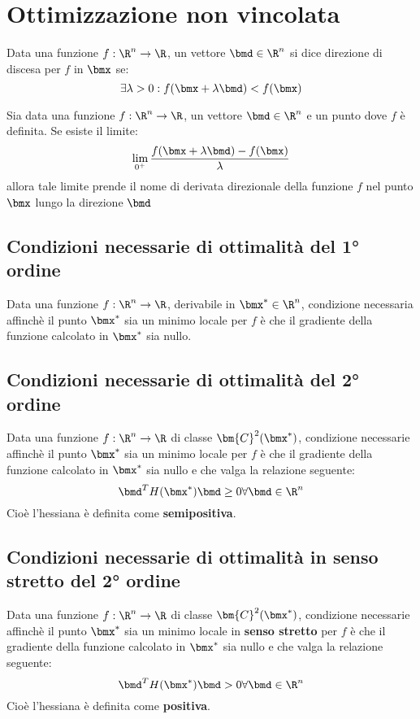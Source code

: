 \documentclass[\main/main.tex]{subfiles}
\begin{document}
\chapter{Ottimizzazione non vincolata}
\begin{definition}
	Data una funzione \(f:\R^n \rightarrow \R \), un vettore \(\bmd \in \R^n\) si dice direzione di discesa per \(f\) in \(\bmx \) se:
	\[
		\exists \lambda > 0: f(\bmx + \lambda\bmd) < f(\bmx)
	\]
\end{definition}
\begin{definition}
	Sia data una funzione \(f: \R^n \rightarrow \R \), un vettore \(\bmd \in \R^n\) e un punto dove \(f\) è definita. Se esiste il limite:
	\[
		\lim_{0^+} \frac{f(\bmx + \lambda\bmd) - f(\bmx)}{\lambda}
	\]
	allora tale limite prende il nome di derivata direzionale della funzione \(f\) nel punto \(\bmx \) lungo la direzione \(\bmd \)
\end{definition}

\section{Condizioni necessarie di ottimalità del 1° ordine}
\begin{theorem}
	Data una funzione \(f: \R^n \rightarrow \R \), derivabile in \(\bmx^* \in \R^n\), condizione necessaria affinchè il punto \(\bmx^* \) sia un minimo locale per \(f\) è che il gradiente della funzione calcolato in \(\bmx^*\) sia nullo.
\end{theorem}
\section{Condizioni necessarie di ottimalità del 2° ordine}
\begin{theorem}
	Data una funzione \(f: \R^n \rightarrow \R \) di classe \(\bm{C}^2(\bmx^*)\), condizione necessarie affinchè il punto \(\bmx^* \) sia un minimo locale per \(f\) è che il gradiente della funzione calcolato in \(\bmx^*\) sia nullo e che valga la relazione seguente:
	\[
		\bmd^T H (\bmx^*)\bmd \geq 0 \forall \bmd \in \R^n
	\]
	Cioè l'hessiana è definita come \textbf{semipositiva}.
\end{theorem}
\section{Condizioni necessarie di ottimalità in senso stretto del 2° ordine}
\begin{theorem}
	Data una funzione \(f: \R^n \rightarrow \R \) di classe \(\bm{C}^2(\bmx^*)\), condizione necessarie affinchè il punto \(\bmx^* \) sia un minimo locale in \textbf{senso stretto} per \(f\) è che il gradiente della funzione calcolato in \(\bmx^*\) sia nullo e che valga la relazione seguente:
	\[
		\bmd^T H (\bmx^*)\bmd > 0 \forall \bmd \in \R^n
	\]
	Cioè l'hessiana è definita come \textbf{positiva}.
\end{theorem}
\end{document}

